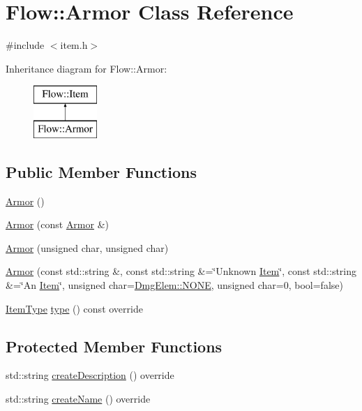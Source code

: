 \hypertarget{class_flow_1_1_armor}{}\section{Flow\+:\+:Armor Class Reference}
\label{class_flow_1_1_armor}


{\ttfamily \#include $<$item.\+h$>$}

Inheritance diagram for Flow\+:\+:Armor\+:\begin{figure}[H]
\begin{center}
\leavevmode
\includegraphics[height=2.000000cm]{class_flow_1_1_armor}
\end{center}
\end{figure}
\subsection*{Public Member Functions}
\begin{DoxyCompactItemize}
\item 
\hyperlink{class_flow_1_1_armor_afadde01c20f1c7670b36f67767459b54}{Armor} ()
\item 
\hyperlink{class_flow_1_1_armor_a36f8f3c519b47009563e8feac8405218}{Armor} (const \hyperlink{class_flow_1_1_armor}{Armor} \&)
\item 
\hyperlink{class_flow_1_1_armor_aa045afaeef733451f35b823b03f5ce49}{Armor} (unsigned char, unsigned char)
\item 
\hyperlink{class_flow_1_1_armor_a0e292337b44478aebf7da35d8c27e814}{Armor} (const std\+::string \&, const std\+::string \&=\char`\"{}Unknown \hyperlink{class_flow_1_1_item}{Item}\char`\"{}, const std\+::string \&=\char`\"{}An \hyperlink{class_flow_1_1_item}{Item}\char`\"{}, unsigned char=\hyperlink{namespace_flow_1_1_dmg_elem_a2c7180f371963927ddcc5b333568a33b}{Dmg\+Elem\+::\+N\+O\+NE}, unsigned char=0, bool=false)
\item 
\hyperlink{namespace_flow_a09368c0b65b3d1bc5c227ed1046c8bca}{Item\+Type} \hyperlink{class_flow_1_1_armor_af1c230e1f7f497caf6bcb86ccf67329d}{type} () const override
\end{DoxyCompactItemize}
\subsection*{Protected Member Functions}
\begin{DoxyCompactItemize}
\item 
std\+::string \hyperlink{class_flow_1_1_armor_a4774ee68bb4814fd645bbedf19958719}{create\+Description} () override
\item 
std\+::string \hyperlink{class_flow_1_1_armor_af8706de01294d876610c7a821e39dc84}{create\+Name} () override
\end{DoxyCompactItemize}
